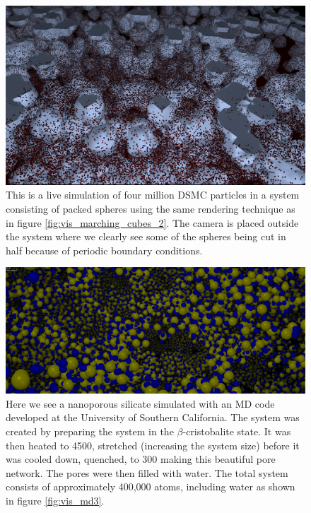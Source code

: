 \begin{figure}[htb]
\begin{center}
\includegraphics[width=\textwidth, trim=0cm 0cm 0cm 0cm, clip]{visualization/figures/marching_cubes_spheres_2.png}
\end{center}
\caption{This is a live simulation of four million DSMC particles in a system consisting of packed spheres using the same rendering technique as in figure \ref{fig:vis_marching_cubes_2}. The camera is placed outside the system where we clearly see some of the spheres being cut in half because of periodic boundary conditions. }
\label{fig:vis_marching_cubes_3}
\end{figure}

\begin{figure}[htb]
\begin{center}
\includegraphics[width=\textwidth, trim=0cm 0cm 0cm 0cm, clip]{visualization/figures/md1.png}
\end{center}
\caption{Here we see a nanoporous silicate simulated with an MD code developed at the University of Southern California. The system was created by preparing the system in the $\beta$-cristobalite state. It was then heated to \unit{4500}{\kelvin}, stretched (increasing the system size) before it was cooled down, quenched, to \unit{300}{\kelvin} making this beautiful pore network. The pores were then filled with water. The total system consists of approximately 400,000 atoms, including water as shown in figure \ref{fig:vis_md3}.}
\label{fig:vis_md2}
\end{figure}

